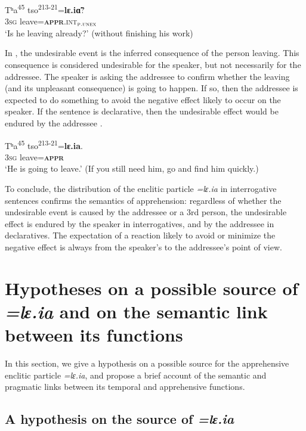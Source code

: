 \documentclass[output=paper,colorlinks,citecolor=brown, language=chinese]{langscibook}
\begin{document}
\ea\label{ex:Song43}
\gll Tʰa\textsuperscript{45} tso\textsuperscript{213-21}=\textbf{lɛ.i\~ɑ}? \\
\textsc{3sg} leave=\textsc{\textbf{appr}.int$_{\textsc{p.unex}}$} \\
\glt `Is he leaving already?' (without finishing his work)
\z

\noindent In , the undesirable event is the inferred consequence of the person leaving. This consequence is considered undesirable for the speaker, but not necessarily for the addressee. The speaker is asking the addressee to confirm whether the leaving (and its unpleasant consequence) is going to happen. If so, then the addressee is expected to do something to avoid the negative effect likely to occur on the speaker. If the sentence is declarative, then  the undesirable effect would be endured by the addressee . 


\ea\label{ex:Song44}
\gll Tʰa\textsuperscript{45} tso\textsuperscript{213-21}=\textbf{lɛ.ia}. \\
\textsc{3sg} leave=\textsc{\textbf{appr}} \\
\glt `He is going to leave.' (If you still need him, go and find him quickly.) 
\z


 To conclude, the distribution of the enclitic particle \textit{=lɛ.ia} in interrogative sentences confirms the semantics of apprehension: regardless of whether the undesirable event is caused by the addressee or a 3rd person, the undesirable effect is endured by the speaker in interrogatives, and by the addressee in declaratives. The expectation of a reaction likely to avoid or minimize the negative effect is always from the speaker's to the addressee's point of view.







\section{Hypotheses on a possible source of \textit{=lɛ.ia} and on the semantic link between its functions}
\label{sec:source}
\largerpage

In this section, we give a hypothesis on a possible source for the apprehensive enclitic particle \textit{=lɛ.ia}, and propose a brief account of the semantic and pragmatic links between its temporal and apprehensive functions.

\subsection{A hypothesis on the source of \textit{=lɛ.ia}}
\label{subsec:hypothesis}
\end{document}
